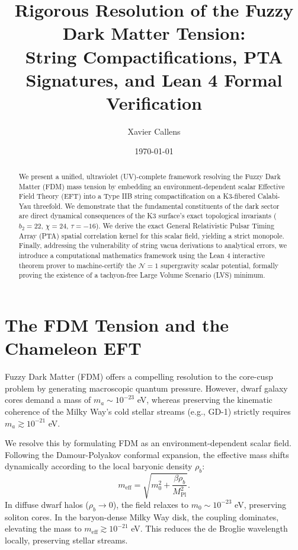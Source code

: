 \documentclass[11pt,a4paper]{article}
\title{\textbf{Rigorous Resolution of the Fuzzy Dark Matter Tension:\\ String Compactifications, PTA Signatures, and Lean 4 Formal Verification}}
\author[1]{Xavier Callens}
\affil[1]{SocrateAI Open Lab, Independent Research Node, France}
\date{\today}
\begin{document}
\maketitle

\begin{abstract}
We present a unified, ultraviolet (UV)-complete framework resolving the Fuzzy Dark Matter (FDM) mass tension by embedding an environment-dependent scalar Effective Field Theory (EFT) into a Type IIB string compactification on a K3-fibered Calabi-Yau threefold. We demonstrate that the fundamental constituents of the dark sector are direct dynamical consequences of the K3 surface's exact topological invariants ($b_2=22$, $\chi=24$, $\tau=-16$). We derive the exact General Relativistic Pulsar Timing Array (PTA) spatial correlation kernel for this scalar field, yielding a strict monopole. Finally, addressing the vulnerability of string vacua derivations to analytical errors, we introduce a computational mathematics framework using the Lean 4 interactive theorem prover to machine-certify the $\mathcal{N}=1$ supergravity scalar potential, formally proving the existence of a tachyon-free Large Volume Scenario (LVS) minimum.
\end{abstract}

\section{The FDM Tension and the Chameleon EFT}
Fuzzy Dark Matter (FDM) offers a compelling resolution to the core-cusp problem by generating macroscopic quantum pressure. However, dwarf galaxy cores demand a mass of $m_a \sim 10^{-23}$ eV, whereas preserving the kinematic coherence of the Milky Way's cold stellar streams (e.g., GD-1) strictly requires $m_a \gtrsim 10^{-21}$ eV.

We resolve this by formulating FDM as an environment-dependent scalar field. Following the Damour-Polyakov conformal expansion, the effective mass shifts dynamically according to the local baryonic density $\rho_b$:
\begin{equation}
    m_{\text{eff}} = \sqrt{m_0^2 + \frac{\beta \rho_b}{M_{\text{Pl}}^2}}.
\end{equation}
In diffuse dwarf halos ($\rho_b \to 0$), the field relaxes to $m_0 \sim 10^{-23}$ eV, preserving soliton cores. In the baryon-dense Milky Way disk, the coupling dominates, elevating the mass to $m_{\text{eff}} \gtrsim 10^{-21}$ eV. This reduces the de Broglie wavelength locally, preserving stellar streams.
\end{document}
